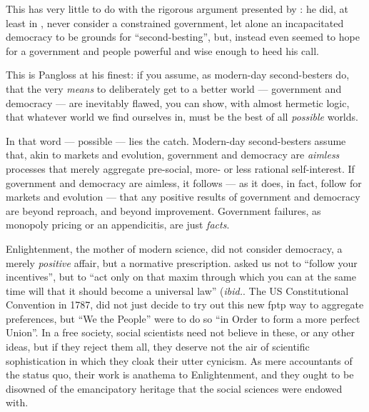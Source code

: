 This has very little to do with the rigorous argument presented by \citeauthor{Lancaster1956}:
he did, at least in \citeyear{Lancaster1956}, never consider a constrained government, let alone an incapacitated democracy to be grounds for ``second-besting'', but, instead even seemed to hope for a government and people powerful and wise enough to heed his call.

This is Pangloss at his finest:
if you assume, as modern-day second-besters do, that the very \emph{means} to deliberately get to a better world --- government and democracy --- are inevitably flawed, you can show, with almost hermetic logic, that whatever world we find ourselves in, must be the best of all \emph{possible} worlds.

In that word --- possible --- lies the catch.
Modern-day second-besters assume that, akin to markets and evolution, government and democracy are \emph{aimless} processes that merely aggregate pre-social, more- or less rational self-interest.
If government and democracy are aimless, it follows --- as it does, in fact, follow for markets and evolution --- that any positive results of government and democracy are beyond reproach, and beyond improvement.
Government failures, as monopoly pricing or an appendicitis, are just \emph{facts}.


Enlightenment, the mother of modern science, did not consider democracy, a merely \emph{positive} affair, but a normative prescription.
\cite{Kant1785} asked us not to ``follow your incentives'', but to ``act only on that maxim through which you can at the same time will that it should become a universal law'' \citeyearpar[Chapter 11]{Kant1785}(\emph{ibid.}.
The US Constitutional Convention in 1787, did not just decide to try out this new \gls{fptp} way to aggregate preferences, but ``We the People'' were to do so ``in Order to form a more perfect Union''.
In a free society, social scientists need not believe in these, or any other ideas, but if they reject them all, they deserve not the air of scientific sophistication in which they cloak their utter cynicism.
As mere accountants of the status quo, their work is anathema to Enlightenment, and they ought to be disowned of the emancipatory heritage that the social sciences were endowed with.

